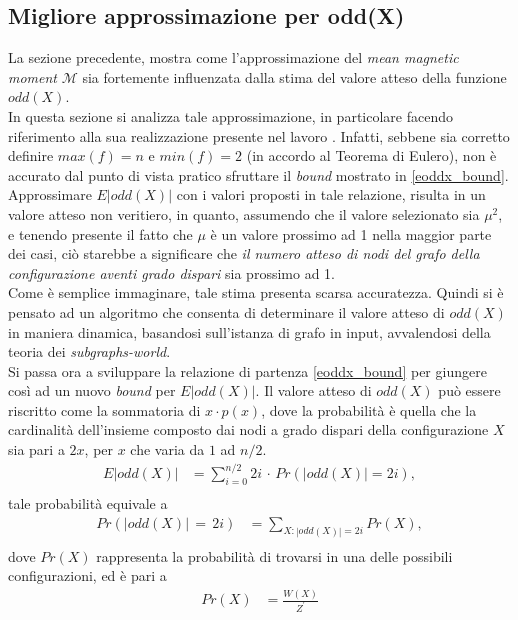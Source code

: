 \subsection{Migliore approssimazione per odd(X)}\label{ssec:betteroddx}
La sezione precedente, mostra come l'approssimazione del \textit{mean magnetic moment} $\mathcal{M}$ sia fortemente influenzata dalla stima del valore atteso della funzione $odd(X)$.\\
In questa sezione si analizza tale approssimazione, in particolare facendo riferimento alla sua realizzazione presente nel lavoro \cite{rinaldi2016approximation}. Infatti, sebbene sia corretto definire $max(f) = n$ e $min(f) = 2$ (in accordo al Teorema di Eulero), non è accurato dal punto di vista pratico sfruttare il \textit{bound} mostrato in \ref{eoddx_bound}. Approssimare $E|odd(X)|$ con i valori proposti in tale relazione, risulta in un valore atteso non veritiero, in quanto, assumendo che il valore selezionato sia $\mu^2$, e tenendo presente il fatto che $\mu$ è un valore prossimo ad 1 nella maggior parte dei casi, ciò starebbe a significare che \textit{il numero atteso di nodi del grafo della configurazione aventi grado dispari} sia prossimo ad 1.\\
Come è semplice immaginare, tale stima presenta scarsa accuratezza. Quindi si è pensato ad un algoritmo che consenta di determinare il valore atteso di $odd(X)$ in maniera dinamica, basandosi sull'istanza di grafo in input, avvalendosi della teoria dei \textit{subgraphs-world}.\\
Si passa ora a sviluppare la relazione di partenza \ref{eoddx_bound} per giungere così ad un nuovo \textit{bound} per $E|odd(X)|$.
Il valore atteso di $odd(X)$ può essere riscritto come la sommatoria di $x \cdot p(x)$, dove la probabilità è quella che la cardinalità dell'insieme composto dai nodi a grado dispari della configurazione $X$ sia pari a $2x$, per $x$ che varia da $1$ ad $n/2$.
\begin{align}
	E|odd(X)| &= \sum_{i=0}^{n/2}{2i\,\cdot\,Pr(|odd(X)|=2i)},\nonumber\\
\end{align}
tale probabilità equivale a
\begin{align}
	Pr(|odd(X)|\,=\,2i) &= \sum_{X:|odd(X)|=2i}{Pr(X)},\nonumber\\
\end{align}
dove $Pr(X)$ rappresenta la probabilità di trovarsi in una delle possibili configurazioni, ed è pari a
\begin{align}
	Pr(X) &= \frac{W(X)}{Z^\prime}\nonumber\\
\end{align}
